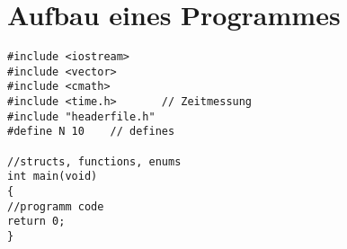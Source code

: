 \section{Aufbau eines Programmes}

\begin{lstlisting}
#include <iostream> 
#include <vector>		
#include <cmath>		
#include <time.h>		// Zeitmessung
#include "headerfile.h" 
#define N 10	// defines 

//structs, functions, enums
int main(void)
{
//programm code
return 0;
}
\end{lstlisting}

